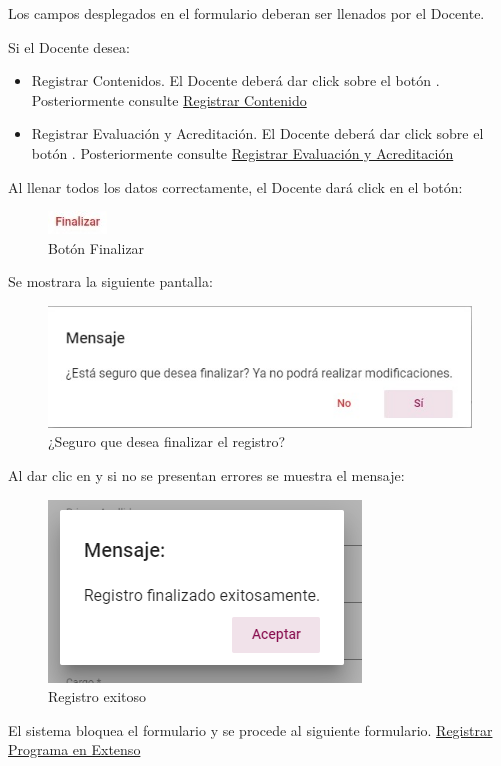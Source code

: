 \documentclass[10pt]{book}
\begin{document}
Los campos desplegados en el formulario deberan ser llenados por el Docente.

Si el Docente desea:

\begin{itemize}
    \item Registrar Contenidos. El Docente deberá dar click sobre el botón . Posteriormente consulte \hyperlink{Registrar Contenido}{Registrar Contenido}
    \item Registrar Evaluación y Acreditación. El Docente deberá dar click sobre el botón . Posteriormente consulte \hyperlink{REyA}{Registrar Evaluación y Acreditación}
\end{itemize}

Al llenar todos los datos correctamente, el Docente dará click en el botón:

\begin{figure}[!hbtp]
    \centering
    \includegraphics[width=0.1\linewidth]{images/SP6/BotonFinalizar.jpeg}
    \caption{Botón Finalizar} 
\end{figure}

Se mostrara la siguiente pantalla:

\begin{figure}[!hbtp]
    \centering
    \includegraphics[width=0.1\linewidth]{images/SP6/DeseaRegistro.jpeg}
    \caption{¿Seguro que desea finalizar el registro?} 
\end{figure}

Al dar clic en  y si no se presentan errores se muestra el mensaje:


\begin{figure}[!hbtp]
    \centering
    \includegraphics[width=0.4\linewidth]{images/SP6/MSG5.png}
    \caption{Registro exitoso}
    \label{mensaje5}
\end{figure}


El sistema bloquea el formulario y se procede al siguiente formulario. \hyperlink{RPE}{Registrar Programa en Extenso}
\end{document}
